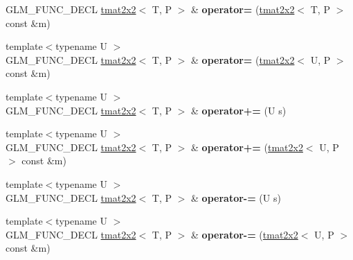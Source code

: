 \begin{DoxyCompactItemize}
\item 
\hypertarget{structglm_1_1detail_1_1tmat2x2_a614355976a61bf79d7e7ab0e445cd954}{G\-L\-M\-\_\-\-F\-U\-N\-C\-\_\-\-D\-E\-C\-L \hyperlink{structglm_1_1detail_1_1tmat2x2}{tmat2x2}$<$ T, P $>$ \& {\bfseries operator=} (\hyperlink{structglm_1_1detail_1_1tmat2x2}{tmat2x2}$<$ T, P $>$ const \&m)}\label{structglm_1_1detail_1_1tmat2x2_a614355976a61bf79d7e7ab0e445cd954}

\item 
\hypertarget{structglm_1_1detail_1_1tmat2x2_a7057eb615bb4f04105d614256cdf5ed6}{{\footnotesize template$<$typename U $>$ }\\G\-L\-M\-\_\-\-F\-U\-N\-C\-\_\-\-D\-E\-C\-L \hyperlink{structglm_1_1detail_1_1tmat2x2}{tmat2x2}$<$ T, P $>$ \& {\bfseries operator=} (\hyperlink{structglm_1_1detail_1_1tmat2x2}{tmat2x2}$<$ U, P $>$ const \&m)}\label{structglm_1_1detail_1_1tmat2x2_a7057eb615bb4f04105d614256cdf5ed6}

\item 
\hypertarget{structglm_1_1detail_1_1tmat2x2_a30f0b88a14ca516adc8717a0032c04d3}{{\footnotesize template$<$typename U $>$ }\\G\-L\-M\-\_\-\-F\-U\-N\-C\-\_\-\-D\-E\-C\-L \hyperlink{structglm_1_1detail_1_1tmat2x2}{tmat2x2}$<$ T, P $>$ \& {\bfseries operator+=} (U s)}\label{structglm_1_1detail_1_1tmat2x2_a30f0b88a14ca516adc8717a0032c04d3}

\item 
\hypertarget{structglm_1_1detail_1_1tmat2x2_a05fd709487eecd8e294390304ff43fec}{{\footnotesize template$<$typename U $>$ }\\G\-L\-M\-\_\-\-F\-U\-N\-C\-\_\-\-D\-E\-C\-L \hyperlink{structglm_1_1detail_1_1tmat2x2}{tmat2x2}$<$ T, P $>$ \& {\bfseries operator+=} (\hyperlink{structglm_1_1detail_1_1tmat2x2}{tmat2x2}$<$ U, P $>$ const \&m)}\label{structglm_1_1detail_1_1tmat2x2_a05fd709487eecd8e294390304ff43fec}

\item 
\hypertarget{structglm_1_1detail_1_1tmat2x2_ac7e38a65f69912901f8d82e65ddd04cc}{{\footnotesize template$<$typename U $>$ }\\G\-L\-M\-\_\-\-F\-U\-N\-C\-\_\-\-D\-E\-C\-L \hyperlink{structglm_1_1detail_1_1tmat2x2}{tmat2x2}$<$ T, P $>$ \& {\bfseries operator-\/=} (U s)}\label{structglm_1_1detail_1_1tmat2x2_ac7e38a65f69912901f8d82e65ddd04cc}

\item 
\hypertarget{structglm_1_1detail_1_1tmat2x2_a37b618643e85ebee82bd95369760ec76}{{\footnotesize template$<$typename U $>$ }\\G\-L\-M\-\_\-\-F\-U\-N\-C\-\_\-\-D\-E\-C\-L \hyperlink{structglm_1_1detail_1_1tmat2x2}{tmat2x2}$<$ T, P $>$ \& {\bfseries operator-\/=} (\hyperlink{structglm_1_1detail_1_1tmat2x2}{tmat2x2}$<$ U, P $>$ const \&m)}\label{structglm_1_1detail_1_1tmat2x2_a37b618643e85ebee82bd95369760ec76}


\end{DoxyCompactItemize}
